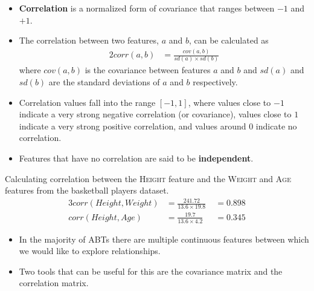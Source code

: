 \documentclass[xcolor={table}]{beamer}
\newcommand{\keyword}[1]{\alert{\textbf{#1}}\index{#1}}
\newcommand{\featN}[1]{\textsc{#1}}
\begin{document}
 \begin{frame} 
  \begin{itemize}
		\item \keyword{Correlation} is a normalized form of covariance that ranges between $-1$ and $+1$.  
		\item The correlation between two features, $a$ and $b$, can be calculated as
\begin{alignat}{2}
corr(a,b) & = \frac{cov(a, b)}{sd(a) \times sd(b)} %
\label{eq:corr}
\end{alignat}
\noindent where $cov(a, b)$ is the covariance between features $a$ and $b$ and $sd(a)$ and $sd(b)$ are the standard deviations of $a$ and $b$ respectively.  
	\end{itemize}
\end{frame} 

 \begin{frame} 
  \begin{itemize}
		\item Correlation values fall  into the range $\left[-1, 1\right]$, where values close to $-1$ indicate a very strong negative correlation (or covariance), values close to $1$ indicate a very strong positive correlation, and values around $0$ indicate no correlation. 
		\item Features that have no correlation are said to be \keyword{independent}. 
	\end{itemize}
\end{frame} 

 \begin{frame} 
 Calculating correlation between  the \featN{Height} feature and the \featN{Weight} and \featN{Age} features from the basketball players dataset. 
\begin{alignat*}{3}
corr(Height,Weight) & = \frac{241.72}{13.6 \times 19.8}\; & = 0.898 \\
corr(Height,Age) & = \frac{19.7}{13.6 \times 4.2}\; & = 0.345
\label{eq:corrExamples}
\end{alignat*}
\end{frame} 



 \begin{frame} 
  \begin{itemize}
		\item In the majority of ABTs there are multiple continuous features between which we would like to explore relationships. 
		\item Two tools that can be useful for this are the covariance matrix and the correlation matrix. 
\end{itemize}
\end{frame} 
\end{document}
